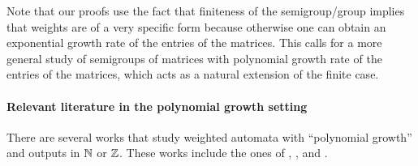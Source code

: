 Note that our proofs use the fact that finiteness of the semigroup/group
implies that weights are of a very specific form because otherwise one can
obtain an exponential growth rate of the entries of the matrices. This calls
for a more general study of semigroups of matrices with polynomial growth rate
of the entries of the matrices, which acts as a natural extension of the
finite case.


\paragraph*{Relevant literature in the polynomial growth setting} There are
several works that study weighted automata with ``polynomial growth'' and
outputs in $\mathbb{N}$ or $\mathbb{Z}$. These works include the ones of \cite{KRRC13},
\cite{CDTL23}, and \cite{LOPEZ25}.


